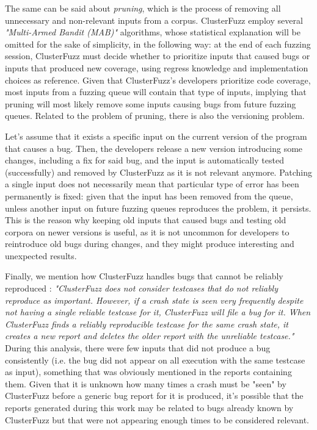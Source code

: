 The same can be said about \textit{pruning}, which is the process of removing all unnecessary and non-relevant inputs from a corpus. ClusterFuzz employ several \textit{"Multi-Armed Bandit (MAB)"} \cite{mab} algorithms, whose statistical explanation will be omitted for the sake of simplicity, in the following way: at the end of each fuzzing session, ClusterFuzz must decide whether to prioritize inputs that caused bugs or inputs that produced new coverage, using regress knowledge and implementation choices as reference. Given that ClusterFuzz's developers prioritize code coverage, most inputs from a fuzzing queue will contain that type of inputs, implying that pruning will most likely remove some inputs causing bugs from future fuzzing queues.
Related to the problem of pruning, there is also the versioning problem.

Let's assume that it exists a specific input on the current version of the program that causes a bug. Then, the developers release a new version introducing some changes, including a fix for said bug, and the input is automatically tested (successfully) and removed by ClusterFuzz as it is not relevant anymore. Patching a single input does not necessarily mean that particular type of error has been permanently is fixed: given that the input has been removed from the queue, unless another input on future fuzzing queues reproduces the problem, it persists. This is the reason why keeping old inputs that caused bugs and testing old corpora on newer versions is useful, as it is not uncommon for developers to reintroduce old bugs during changes, and they might produce interesting and unexpected results.

Finally, we mention how ClusterFuzz handles bugs that cannot be reliably reproduced \cite{unreliable}: 
\textit{"ClusterFuzz does not consider testcases that do not reliably reproduce as important. However, if a crash state is seen very frequently despite not having a single reliable testcase for it, ClusterFuzz will file a bug for it. When ClusterFuzz finds a reliably reproducible testcase for the same crash state, it creates a new report and deletes the older report with the unreliable testcase."}
During this analysis, there were few inputs that did not produce a bug consistently (i.e. the bug did not appear on all execution with the same testcase as input), something that was obviously mentioned in the reports containing them. Given that it is unknown how many times a crash must be "seen" by ClusterFuzz before a generic bug report for it is produced, it's possible that the reports generated during this work may be related to bugs already known by ClusterFuzz but that were not appearing enough times to be considered relevant.



